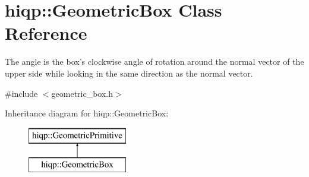 \hypertarget{classhiqp_1_1GeometricBox}{\section{hiqp\-:\-:Geometric\-Box Class Reference}
\label{classhiqp_1_1GeometricBox}
}


The angle is the box's clockwise angle of rotation around the normal vector of the upper side while looking in the same direction as the normal vector.  




{\ttfamily \#include $<$geometric\-\_\-box.\-h$>$}

Inheritance diagram for hiqp\-:\-:Geometric\-Box\-:\begin{figure}[H]
\begin{center}
\leavevmode
\includegraphics[height=2.000000cm]{classhiqp_1_1GeometricBox}
\end{center}
\end{figure}
